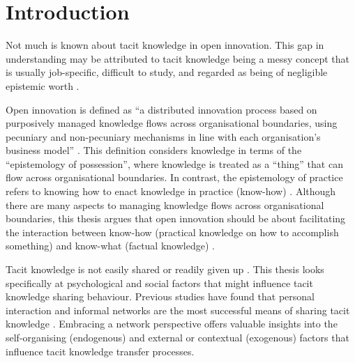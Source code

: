 \section{Introduction}

Not much is known about tacit knowledge in open innovation. This gap in understanding may be attributed to tacit knowledge being a messy concept that is usually job-specific, difficult to study, and regarded as being of negligible epistemic worth \citep{mohajan2016sharing}. \medskip

Open innovation is defined as \enquote{a distributed innovation process based on purposively managed knowledge flows across organisational boundaries, using pecuniary and non-pecuniary mechanisms in line with each organisation’s business model} \citep[][pg.~17]{chesbrough2014explicating}. This definition considers knowledge in terms of the \enquote{epistemology of possession}, where knowledge is treated as a \enquote{thing} that can flow across organisational boundaries. In contrast, the epistemology of practice refers to knowing how to enact knowledge in practice (know-how) \citep{cook1999bridging,marabelli2014knowing}. Although there are many aspects to managing knowledge flows across organisational boundaries, this thesis argues that open innovation should be about facilitating the interaction between know-how (practical knowledge on how to accomplish something) and know-what (factual knowledge) \citep{winter1987knowledge, brown1991organizational, brown2001knowledge, garud1997distinction}. \medskip

Tacit knowledge is not easily shared or readily given up \citep{von1994sticky, szulanski2003sticky, seidler2008use}. This thesis looks specifically at psychological and social factors that might influence tacit knowledge sharing behaviour. Previous studies have found that personal interaction and informal networks are the most successful means of sharing tacit knowledge \citep{holste2010trust,mohajan2016sharing,khatun2018sharing}. Embracing a network perspective offers valuable insights into the self-organising (endogenous) and external or contextual (exogenous) factors that influence tacit knowledge transfer processes. \medskip

